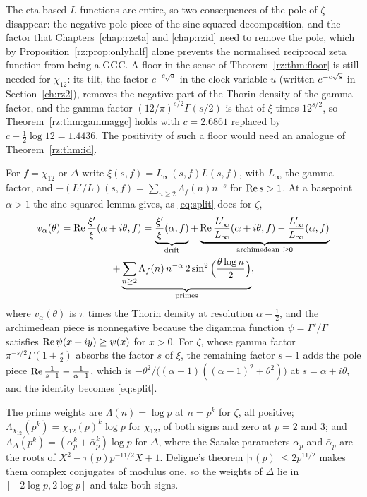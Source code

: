 The eta based $L$ functions are entire, so two consequences of the pole of $\zeta$ disappear: the negative pole piece of the sine squared decomposition, and the factor that Chapters~\ref{chap:rzeta} and \ref{chap:rzid} need to remove the pole, which by Proposition~\ref{rz:prop:onlyhalf} alone prevents the normalised reciprocal zeta function from being a GGC. A floor in the sense of Theorem~\ref{rz:thm:floor} is still needed for $\chi_{12}$: its tilt, the factor $e^{-c\sqrt u}$ in the clock variable $u$ (written $e^{-c\sqrt{s}}$ in Section~\ref{ch:rz2}), removes the negative part of the Thorin density of the gamma factor, and the gamma factor $(12/\pi)^{s/2}\Gamma(s/2)$ is that of $\xi$ times $12^{s/2}$, so Theorem~\ref{rz:thm:gammaggc} holds with $c=2.6861$ replaced by $c-\frac12\log12=1.4436$. The positivity of such a floor would need an analogue of Theorem~\ref{rz:thm:id}.

For $f=\chi_{12}$ or $\Delta$ write $\xi(s,f)=L_\infty(s,f)L(s,f)$, with $L_\infty$ the gamma factor, and $-(L'/L)(s,f)=\sum_{n\ge2}\Lambda_f(n)n^{-s}$ for $\operatorname{Re} s>1$. At a basepoint $\alpha>1$ the sine squared lemma gives, as \eqref{eq:split} does for $\zeta$,
\begin{multline*}
v_\alpha(\theta)=\re\frac{\xi'}{\xi}(\alpha+i\theta,f)=\underbrace{\frac{\xi'}{\xi}(\alpha,f)}_{\text{drift}}+\underbrace{\re\frac{L_\infty'}{L_\infty}(\alpha+i\theta,f)-\frac{L_\infty'}{L_\infty}(\alpha,f)}_{\text{archimedean}\ \ge0}\\
+\underbrace{\sum_{n\ge2}\Lambda_f(n)\,n^{-\alpha}\,2\sin^2\Big(\frac{\theta\log n}2\Big)}_{\text{primes}},
\end{multline*}
where $v_\alpha(\theta)$ is $\pi$ times the Thorin density at resolution $\alpha-\frac12$, and the archimedean piece is nonnegative because the digamma function $\psi=\Gamma'/\Gamma$ satisfies $\operatorname{Re}\psi(x+iy)\ge\psi(x)$ for $x>0$. For $\zeta$, whose gamma factor $\pi^{-s/2}\Gamma(1+\frac s2)$ absorbs the factor $s$ of $\xi$, the remaining factor $s-1$ adds the pole piece $\operatorname{Re}\frac1{s-1}-\frac1{\alpha-1}$, which is $-\theta^2/\big((\alpha-1)((\alpha-1)^2+\theta^2)\big)$ at $s=\alpha+i\theta$, and the identity becomes \eqref{eq:split}.

The prime weights are $\Lambda(n)=\log p$ at $n=p^k$ for $\zeta$, all positive; $\Lambda_{\chi_{12}}(p^k)=\chi_{12}(p)^k\log p$ for $\chi_{12}$, of both signs and zero at $p=2$ and $3$; and $\Lambda_\Delta(p^k)=(\alpha_p^k+\bar\alpha_p^k)\log p$ for $\Delta$, where the Satake parameters $\alpha_p$ and $\bar\alpha_p$ are the roots of $X^2-\tau(p)p^{-11/2}X+1$. Deligne's theorem $|\tau(p)|\le2p^{11/2}$ \cite{Deligne74} makes them complex conjugates of modulus one, so the weights of $\Delta$ lie in $[-2\log p,2\log p]$ and take both signs.

